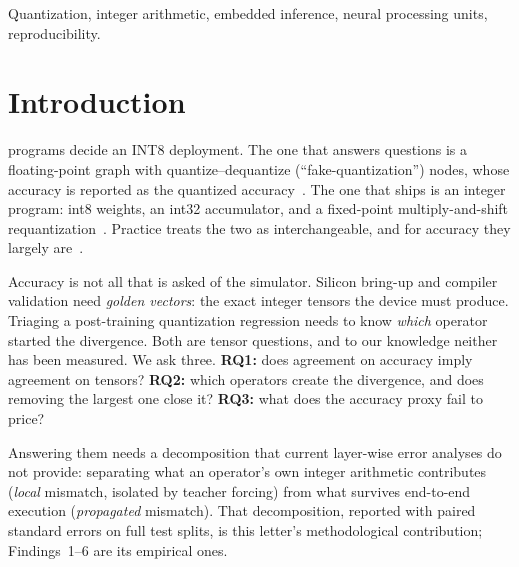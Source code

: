 \documentclass[journal]{IEEEtran}
\begin{document}
\begin{IEEEkeywords}
Quantization, integer arithmetic, embedded inference, neural processing units, reproducibility.
\end{IEEEkeywords}

\section{Introduction}
 programs decide an INT8 deployment. The one that answers questions is a
floating-point graph with quantize--dequantize (``fake-quantization'') nodes, whose accuracy is reported as
the quantized accuracy~\cite{jacob2018,krishnamoorthi2018}. The one that ships is an integer program: int8
weights, an int32 accumulator, and a fixed-point multiply-and-shift requantization~\cite{gemmlowp}.
Practice treats the two as interchangeable, and for accuracy they largely are~\cite{nagel2021}.

Accuracy is not all that is asked of the simulator. Silicon bring-up and compiler validation need
\emph{golden vectors}: the exact integer tensors the device must produce. Triaging a post-training
quantization regression needs to know \emph{which} operator started the divergence. Both are tensor
questions, and to our knowledge neither has been measured. We ask three.
\textbf{RQ1:} does agreement on accuracy imply agreement on tensors?
\textbf{RQ2:} which operators create the divergence, and does removing the largest one close it?
\textbf{RQ3:} what does the accuracy proxy fail to price?

Answering them needs a decomposition that current layer-wise error analyses do not provide: separating what
an operator's own integer arithmetic contributes (\emph{local} mismatch, isolated by teacher forcing) from
what survives end-to-end execution (\emph{propagated} mismatch). That decomposition, reported with paired
standard errors on full test splits, is this letter's methodological contribution; Findings~1--6 are its
empirical ones.

\begin{table}[!t]
\caption{Fake quantization versus bit-exact integer execution, complete test splits. \textsc{pc}: per-channel
weights, \textsc{pt}: per-tensor. $\Delta$ is (integer $-$ fake) top-1 on the same images, with its paired
standard error. ``codes'' is the fraction of output logit codes that differ; ``imgs'' the fraction of images
with at least one differing code.}
\label{tab:fidelity}
\centering
\footnotesize

\end{table}
\end{document}
